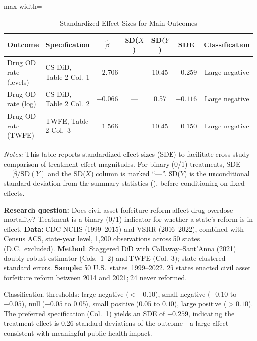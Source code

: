 \documentclass[12pt]{article}
\begin{document}
\begin{table}[H]
\centering
\caption{Standardized Effect Sizes for Main Outcomes}
\label{tab:sde}
\begin{adjustbox}{max width=\textwidth}
\begin{tabular}{llccccc}
\toprule
Outcome & Specification & $\hat{\beta}$ & SD($X$) & SD($Y$) & SDE & Classification \\
\midrule
Drug OD rate (levels)  & CS-DiD, Table 2 Col.\ 1   & $-2.706$ & ---  & 10.45 & $-0.259$ & Large negative \\
Drug OD rate (log)     & CS-DiD, Table 2 Col.\ 2   & $-0.066$ & ---  & 0.57  & $-0.116$ & Large negative \\
Drug OD rate (TWFE)    & TWFE, Table 2 Col.\ 3     & $-1.566$ & ---  & 10.45 & $-0.150$ & Large negative \\
\bottomrule
\end{tabular}
\end{adjustbox}
\par\vspace{0.3em}
{\footnotesize \emph{Notes:} This table reports standardized effect sizes (SDE)
to facilitate cross-study comparison of treatment effect magnitudes.
For binary (0/1) treatments, SDE $= \hat{\beta} / \text{SD}(Y)$ and the SD($X$)
column is marked ``---''.
SD($Y$) is the unconditional standard deviation from the summary
statistics (), before conditioning on fixed effects.

\textbf{Research question:} Does civil asset forfeiture reform affect drug overdose mortality? Treatment is a binary (0/1) indicator for whether a state's reform is in effect.
\textbf{Data:} CDC NCHS (1999--2015) and VSRR (2016--2022), combined with Census ACS, state-year level, 1,200 observations across 50 states (D.C.\ excluded).
\textbf{Method:} Staggered DiD with Callaway--Sant'Anna (2021) doubly-robust estimator (Cols.\ 1--2) and TWFE (Col.\ 3); state-clustered standard errors.
\textbf{Sample:} 50 U.S.\ states, 1999--2022. 26 states enacted civil asset forfeiture reform between 2014 and 2021; 24 never reformed.

Classification thresholds:
large negative ($< -0.10$), small negative ($-0.10$ to $-0.05$),
null ($-0.05$ to $0.05$), small positive ($0.05$ to $0.10$),
large positive ($> 0.10$).
The preferred specification (Col.\ 1) yields an SDE of $-0.259$, indicating the treatment effect is 0.26 standard deviations of the outcome---a large effect consistent with meaningful public health impact.}
\end{table}
\end{document}
